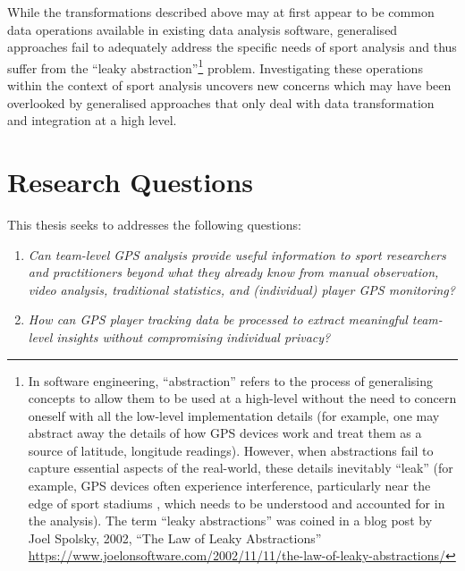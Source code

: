 While the transformations described above may at first appear to be common data operations available in existing data analysis software, generalised approaches fail to adequately address the specific needs of sport analysis and thus suffer from the ``leaky abstraction''\footnote{In software engineering, ``abstraction'' refers to the process of generalising concepts to allow them to be used at a high-level without the need to concern oneself with all the low-level implementation details (for example, one may abstract away the details of how GPS devices work and treat them as a source of latitude, longitude readings). However, when abstractions fail to capture essential aspects of the real-world, these details inevitably ``leak'' (for example, GPS devices often experience interference, particularly near the edge of sport stadiums \cite{Williams2009}, which needs to be understood and accounted for in the analysis). The term ``leaky abstractions'' was coined in a blog post by Joel Spolsky, 2002, ``The Law of Leaky Abstractions'' \url{https://www.joelonsoftware.com/2002/11/11/the-law-of-leaky-abstractions/}} problem. Investigating these operations within the context of sport analysis uncovers new concerns which may have been overlooked by generalised approaches that only deal with data transformation and integration at a high level.

\section{Research Questions}
\label{sec:questions}

This thesis seeks to addresses the following questions:

\begin{enumerate}
  \item \textit{Can team-level GPS analysis provide useful information to sport researchers and practitioners beyond what they already know from manual observation, video analysis, traditional statistics, and (individual) player GPS monitoring?}
  \item \textit{How can GPS player tracking data be processed to extract meaningful team-level insights without compromising individual privacy?}
\end{enumerate}




